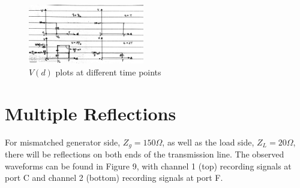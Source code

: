 \documentclass[10pt]{article}
\begin{document}
\begin{figure}[h]
    \centering
    \includegraphics[width=0.45\textwidth]{../photos/lab1/v_d_gamma_L.jpg}
    \caption{$V(d)$ plots at different time points\vspace{-0.5cm}}
    \label{v_d_different_T}
\end{figure}

\section{Multiple Reflections}

For mismatched generator side, $Z_g = 150\Omega$, as well as the load side, $Z_L = 20\Omega$, there will 
be reflections on both ends of the transmission line. The observed waveforms can be found in Figure 9, with channel 1 (top) recording
signals at port C and channel 2 (bottom) recording signals at port F.
\end{document}
